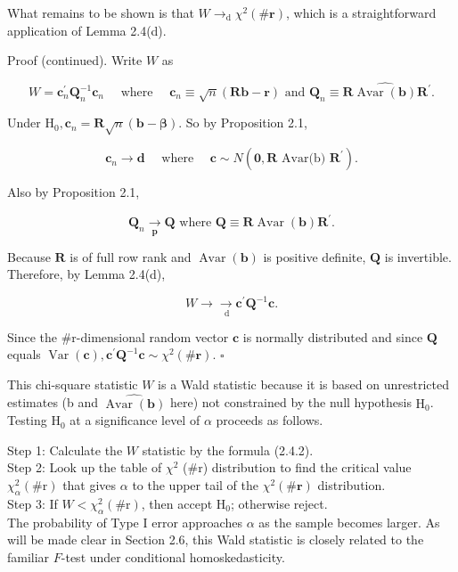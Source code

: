 \documentclass[10pt]{article}
\begin{document}
What remains to be shown is that $W \rightarrow_{\mathrm{d}} \chi^{2}(\# \mathbf{r})$, which is a straightforward application of Lemma 2.4(d).

Proof (continued). Write $W$ as

$$
W=\mathbf{c}_{n}^{\prime} \mathbf{Q}_{n}^{-1} \mathbf{c}_{n} \quad \text { where } \quad \mathbf{c}_{n} \equiv \sqrt{n}(\mathbf{R} \mathbf{b}-\mathbf{r}) \text { and } \mathbf{Q}_{n} \equiv \mathbf{R} \widehat{\operatorname{Avar}(\mathbf{b})} \mathbf{R}^{\prime} .
$$

Under $\mathrm{H}_{0}, \mathbf{c}_{n}=\mathbf{R} \sqrt{n}(\mathbf{b}-\boldsymbol{\beta})$. So by Proposition 2.1,

$$
\mathbf{c}_{n} \rightarrow \mathbf{d} \quad \text { where } \quad \mathbf{c} \sim N\left(\mathbf{0}, \mathbf{R} \text { Avar(b) } \mathbf{R}^{\prime}\right) .
$$

Also by Proposition 2.1,

$$
\mathbf{Q}_{n} \underset{\mathbf{p}}{\rightarrow} \mathbf{Q} \text { where } \mathbf{Q} \equiv \mathbf{R} \operatorname{Avar}(\mathbf{b}) \mathbf{R}^{\prime} .
$$

Because $\mathbf{R}$ is of full row rank and $\operatorname{Avar}(\mathbf{b})$ is positive definite, $\mathbf{Q}$ is invertible. Therefore, by Lemma 2.4(d),

$$
W \rightarrow \underset{\mathrm{~d}}{\rightarrow} \mathbf{c}^{\prime} \mathbf{Q}^{-1} \mathbf{c} .
$$

Since the \#r-dimensional random vector $\mathbf{c}$ is normally distributed and since $\mathbf{Q}$ equals $\operatorname{Var}(\mathbf{c}), \mathbf{c}^{\prime} \mathbf{Q}^{-1} \mathbf{c} \sim \chi^{2}(\# \mathbf{r})$. \(\square\)

This chi-square statistic $W$ is a Wald statistic because it is based on unrestricted estimates (b and $\widehat{\operatorname{Avar}(\mathbf{b})}$ here) not constrained by the null hypothesis $\mathrm{H}_{0}$. Testing $\mathrm{H}_{0}$ at a significance level of $\alpha$ proceeds as follows.

Step 1: Calculate the $W$ statistic by the formula (2.4.2).\\
Step 2: Look up the table of $\chi^{2}$ (\#r) distribution to find the critical value $\chi_{\alpha}^{2}(\# \mathrm{r})$ that gives $\alpha$ to the upper tail of the $\chi^{2}(\# \mathbf{r})$ distribution.\\
Step 3: If $W<\chi_{\alpha}^{2}(\# \mathrm{r})$, then accept $\mathrm{H}_{0}$; otherwise reject.\\
The probability of Type I error approaches $\alpha$ as the sample becomes larger. As will be made clear in Section 2.6, this Wald statistic is closely related to the familiar $F$-test under conditional homoskedasticity.
\end{document}
